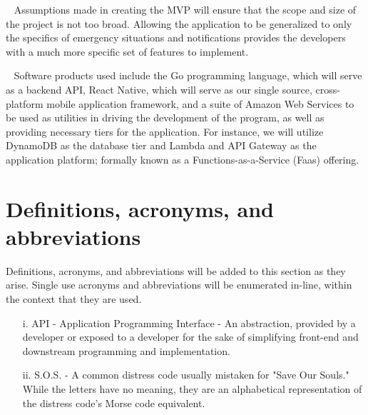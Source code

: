 \documentclass{scrreprt}
\begin{document}
\par ~ Assumptions made in creating the MVP will ensure that the scope and size of the project is not too broad. Allowing the application to be generalized to only the specifics of emergency situations and notifications provides the developers with a much more specific set of features to implement.

\par ~ Software products used include the Go programming language, which will serve as a backend API, React Native, which will serve as our single source, cross-platform mobile application framework, and a suite of Amazon Web Services to be used as utilities in driving the development of the program, as well as providing necessary tiers for the application. For instance, we will utilize DynamoDB as the database tier and Lambda and API Gateway as the application platform; formally known as a Functions-as-a-Service (Faas) offering.


\section{Definitions, acronyms, and abbreviations}
Definitions, acronyms, and abbreviations will be added to this section as they arise. Single use acronyms and abbreviations will be enumerated in-line, within the context that they are used.
\begin{enumerate}
	\item[i.] API - Application Programming Interface - An abstraction, provided by a developer or exposed to a developer for the sake of simplifying front-end and downstream programming and implementation.
	\item[ii.] S.O.S. - A common distress code usually mistaken for "Save Our Souls." While the letters have no meaning, they are an alphabetical representation of the distress code's Morse code equivalent.
\end{enumerate}
 
\end{document}
